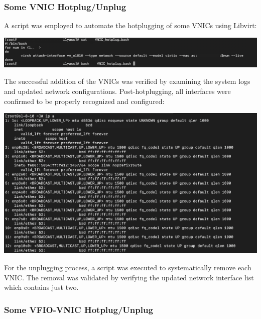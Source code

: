 \subsubsection[Some VNIC Hotplug/Unplug]{Some VNIC Hotplug/Unplug}

A script was employed to automate the hotplugging of some VNICs using Libvirt:

\begin{center}
    \centering
    \includegraphics[width=\textwidth]{Images/Script hotplug VNIC Libvirt.png}
    \label{fig:casa}
\end{center}

The successful addition of the VNICs was verified by examining the system logs and updated network configurations. Post-hotplugging, all interfaces were confirmed to be properly recognized and configured:

\begin{center}
    \centering
    \includegraphics[width=\textwidth]{Images/ip a after hotplug VNIC Libvirt.png}
    \label{fig:casa}
\end{center}

For the unplugging process, a script was executed to systematically remove each VNIC. The removal was validated by verifying the updated network interface list which contains just two.

\subsubsection[Some VFIO-VNIC Hotplug/Unplug]{Some VFIO-VNIC Hotplug/Unplug}

